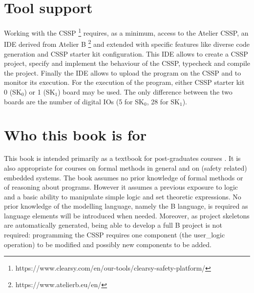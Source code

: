 \section{Tool support}
Working with the CSSP \footnote{https://www.clearsy.com/en/our-tools/clearsy-safety-platform/} requires, as a minimum, access to the Atelier CSSP, an IDE derived from Atelier B \footnote{https://www.atelierb.eu/en/} and extended with specific features like diverse code generation and CSSP starter kit configuration. This IDE allows to create a CSSP project, specify and implement the behaviour of the CSSP, typecheck and compile the project. Finally the IDE allows to upload the program on the CSSP and to monitor its execution. For the execution of the program, either CSSP starter kit 0 (SK$_0$) or 1 (SK$_1$) board may be used. The only difference between the two boards are the number of digital IOs (5 for SK$_0$, 28 for SK$_1$). 


\section{Who this book is for}
This book is intended primarily as a textbook for post-graduates courses . It is also appropriate for courses on formal methods in general and on (safety related) embedded systems. The book assumes no prior knowledge of formal methods or of reasoning about programs. However it assumes a previous exposure to logic and a basic ability to manipulate simple logic and set theoretic expressions. No prior knowledge of the modelling language, namely the B language, is required as language elements will be introduced when needed. Moreover, as project skeletons are automatically generated, being able to develop a full B project is not required: programming the CSSP requires one component (the user\_logic operation) to be modified and possibly new components to be added. 

